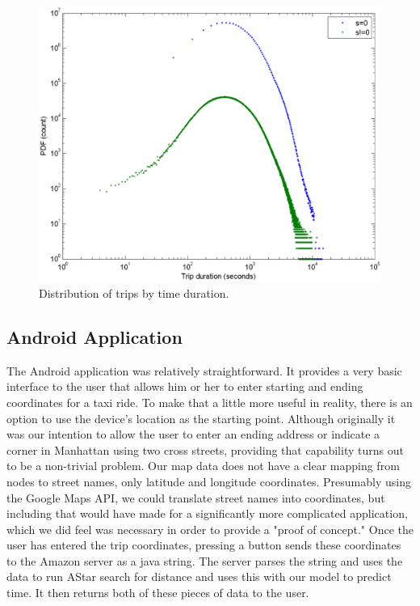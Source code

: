 \documentclass{sig-alternate}
\begin{document}
\begin{figure}
\includegraphics[scale=.20]{tpdf.eps}
\caption{Distribution of trips by time duration.}
\end{figure}

\subsection{Android Application}


The Android application was relatively straightforward.  It provides a very basic interface to the user that allows him or her to enter starting and ending coordinates for a taxi ride. To make that a little more useful in reality, there is an option to use the device's location as the starting point.  Although originally it was our intention to allow the user to enter an ending address or indicate a corner in Manhattan using two cross streets, providing that capability turns out to be a non-trivial problem.  Our map data does not have a clear mapping from nodes to street names, only latitude and longitude coordinates.  Presumably using the Google Maps API, we could translate street names into coordinates, but including that would have made for a significantly more complicated application, which we did feel was necessary in order to provide a "proof of concept."  Once the user has entered the trip coordinates, pressing a button sends these coordinates to the Amazon server as a java string.  The server parses the string and uses the data to run AStar search for distance and uses this with our model to predict time.  It then returns both of these pieces of data to the user.
\end{document}
